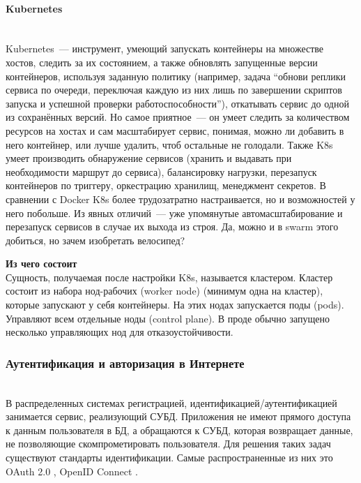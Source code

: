 \paragraph{Kubernetes} ~\\
    Kubernetes~--- инструмент, умеющий запускать контейнеры на множестве хостов, следить за их состоянием, а также обновлять запущенные версии контейнеров, используя заданную политику (например, задача ``обнови реплики сервиса по очереди, переключая каждую из них лишь по завершении
    скриптов запуска и успешной проверки работоспособности''), откатывать сервис до одной из сохранённых версий. Но самое приятное~--- он умеет следить за количеством ресурсов на хостах и сам масштабирует сервис, понимая, можно ли добавить в него контейнер, или лучше удалить,
    чтоб остальные не голодали. Также K8s умеет производить обнаружение сервисов (хранить и выдавать при необходимости маршрут до сервиса), балансировку нагрузки, перезапуск контейнеров по триггеру, оркестрацию хранилищ, менеджмент секретов. В сравнении с Docker K8s более трудозатратно настраивается, но и возможностей у него побольше.
    Из явных отличий~--- уже упомянутые автомасштабирование и перезапуск сервисов в случае их выхода из строя. Да, можно и в swarm этого добиться, но зачем изобретать велосипед?

    \textbf{Из чего состоит} ~\\
    Сущность, получаемая после настройки K8s, называется кластером. Кластер состоит из набора нод-рабочих (worker node) (минимум одна на кластер), которые запускают у себя контейнеры. На этих нодах запускается поды (pods). Управляют всем отдельные ноды (control plane). В проде обычно запущено несколько управляющих нод для отказоустойчивости. \autocite{KuberComponents}

\subsubsection{Аутентификация и авторизация в Интернете}~\\

В распределенных системах регистрацией, идентификацией/аутентификацией занимается
сервис, реализующий СУБД. Приложения не имеют прямого доступа к данным
пользователя в БД, а обращаются к СУБД, которая возвращает данные, не позволяющие
скомпрометировать пользователя. Для решения таких задач существуют стандарты
идентификации. Самые распространенные из них это OAuth 2.0 \autocite{OAuth2.0}, OpenID Connect \autocite{OpenIDConnect}.~\\

